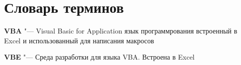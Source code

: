 \chapter*{Словарь терминов}             %

\textbf{VBA} "--- Visual Basic for Application язык программрования встроенный в Excel и использованный для написания макросов \unf

\textbf{VBE} "--- Среда разработки для языка VBA. Встроена в Excel

